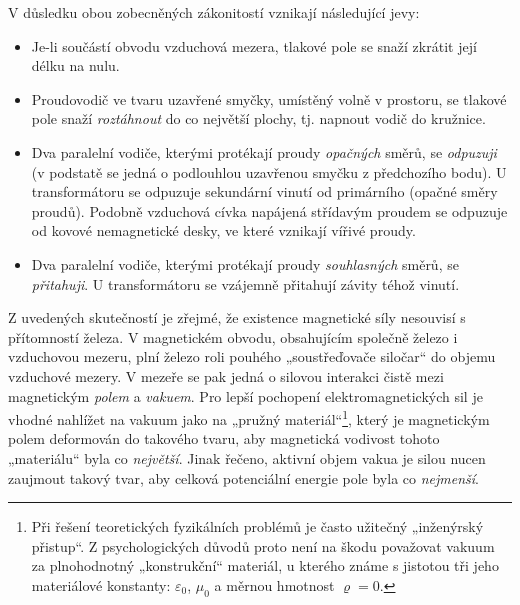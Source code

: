       V důsledku obou zobecněných zákonitostí vznikají následující jevy:
      \begin{itemize}[noitemsep]
        \item Je-li součástí obvodu vzduchová mezera, tlakové pole se snaží zkrátit její délku na 
              nulu.
        \item Proudovodič ve tvaru uzavřené smyčky, umístěný volně v prostoru, se tlakové pole   
              snaží \emph{roztáhnout} do co největší plochy, tj. napnout vodič do kružnice.
        \item Dva paralelní vodiče, kterými protékají proudy \emph{opačných} směrů, se 
              \emph{odpuzuji} (v podstatě se jedná o podlouhlou uzavřenou smyčku z předchozího 
              bodu). U transformátoru se odpuzuje sekundární vinutí od primárního (opačné směry 
              proudů). Podobně vzduchová cívka napájená střídavým proudem se odpuzuje od kovové 
              nemagnetické desky, ve které vznikají vířivé proudy.
        \item Dva paralelní vodiče, kterými protékají proudy \emph{souhlasných} směrů, se 
              \emph{přitahuji}. U transformátoru se vzájemně přitahují závity téhož vinutí.
      \end{itemize}
      
      Z uvedených skutečností je zřejmé, že existence magnetické síly nesouvisí s přítomností 
      železa. V magnetickém obvodu, obsahujícím společně železo i vzduchovou mezeru, plní železo 
      roli pouhého „soustřeďovače siločar“ do objemu vzduchové mezery. V mezeře se pak jedná o 
      silovou interakci čistě mezi magnetickým \emph{polem} a \emph{vakuem}. Pro lepší pochopení 
      elektromagnetických sil je vhodné nahlížet na vakuum jako na „pružný materiál“\footnote{Při 
      řešení teoretických fyzikálních problémů je často užitečný „inženýrský přistup“. Z 
      psychologických důvodů proto není na škodu považovat vakuum za plnohodnotný „konstrukční“ 
      materiál, u kterého známe s jistotou tři jeho materiálové konstanty: \(\varepsilon_0\), 
      \(\mu_0\) a měrnou hmotnost \(\varrho = 0\).}, který je magnetickým polem 
      deformován do takového tvaru, aby magnetická vodivost tohoto „materiálu“ byla co 
      \emph{největší}. Jinak řečeno, aktivní objem vakua je silou nucen zaujmout takový tvar, aby 
      celková potenciální energie pole byla co \emph{nejmenší}.
      
